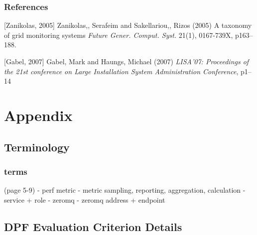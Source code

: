 \documentclass{beamer}
\renewcommand\appendixname{Appendix}
\begin{document}



\begin{frame}
\frametitle{References}
\footnotesize{
\begin{thebibliography}{99} %

[Zanikolas, 2005] {Zanikolas,, Serafeim and Sakellariou,, Rizos} (2005)
\newblock A taxonomy of grid monitoring systems
\newblock \emph{Future Gener. Comput. Syst.} 21(1), 0167-739X, p163--188.

[Gabel, 2007] {Gabel, Mark and Haungs, Michael} (2007)
\newblock \emph{LISA'07: Proceedings of the 21st conference on Large Installation System Administration Conference}, p1--14

\end{thebibliography}
}
\end{frame}


\appendix

\section{\appendixname}
\frame{\tableofcontents}

\subsection{Terminology}

\begin{frame}
\frametitle{terms}
(page 5-9)
-   perf metric
-   metric sampling, reporting, aggregation, calculation
-   service + role
-   zeromq
-   zeromq address + endpoint
\end{frame}

\subsection{DPF Evaluation Criterion Details}
\end{document}

